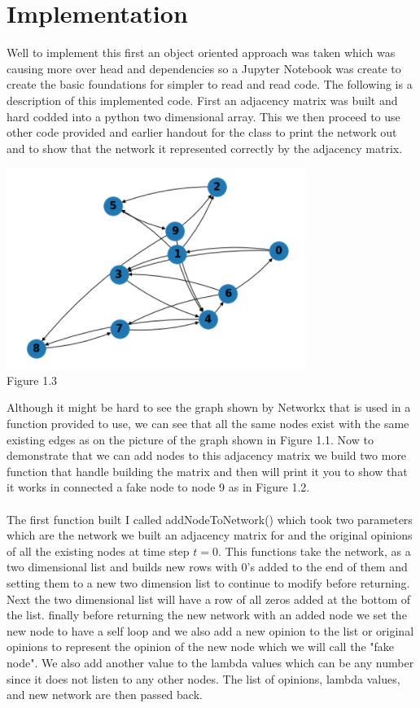 \documentclass[letterpaper]{article}
\begin{document}
\section{Implementation}  

Well to implement this first an object oriented approach was taken which was causing more over head and dependencies so a Jupyter Notebook was create to create the basic foundations for simpler to read and read code.  The following is a description of this implemented code.  First an adjacency matrix was built and hard codded into a python two dimensional array.  This we then proceed to use other code provided and earlier handout for the class to print the network out and to show that the network it represented correctly by the adjacency matrix.  
\begin{center}
	\includegraphics[scale=1.5]{./Images/Figure1.3} \\
	Figure 1.3
\end{center}
Although it might be hard to see the graph shown by Networkx that is used in a function provided to use, we can see that all the same nodes exist with the same existing edges as on the picture of the graph shown in Figure 1.1.  Now to demonstrate that we can add nodes to this adjacency matrix we build two more function that handle building the matrix and then will print it you to show that it works in connected a fake node to node 9 as in Figure 1.2.\\\\
The first function built I called addNodeToNetwork() which took two parameters which are the network we built an adjacency matrix for and the original opinions of all the existing nodes at time step $t=0$.  This functions take the network, as a two dimensional list and builds new rows with 0's added to the end of them and setting them to a new two dimension list to continue to modify before returning.  Next the two dimensional list will have a row of all zeros added at the bottom of the list. finally before returning the new network with an added node we set the new node to have a self loop and we also add a new opinion to the list or original opinions to represent the opinion of the new node which we will call the "fake node".  We also add another value to the lambda values which can be any number since it does not listen to any other nodes. The list of opinions, lambda values, and new network are then passed back. \\\\
\end{document}

